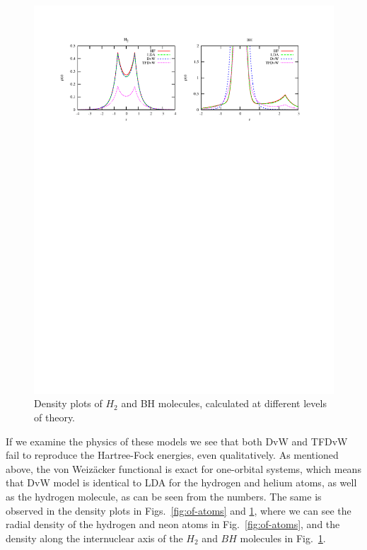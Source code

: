 \begin{figure}
    \centering
    \includegraphics[scale=0.7, viewport = 50 560 550 755]{figures/of_molecules.pdf}
    \caption{\footnotesize{Density plots of $H_2$ and BH molecules, calculated at different
	levels of theory.}}
    \label{fig:of-molecules}
\end{figure}

If we examine the physics of these models we see that both DvW and TFDvW fail to reproduce 
the Hartree-Fock energies, even qualitatively. As mentioned above, the von Weiz\"{a}cker 
functional is exact for one-orbital systems, which means that DvW model is identical to LDA 
for the hydrogen and helium atoms, as well as the hydrogen molecule, as can be seen from the 
numbers. The same is observed in the density plots in Figs.~\ref{fig:of-atoms} and 
\ref{fig:of-molecules}, where we can see the radial density of the hydrogen and neon atoms 
in Fig.~\ref{fig:of-atoms}, and the density along the internuclear axis of the $H_2$ and 
$BH$ molecules in Fig.~\ref{fig:of-molecules}. 

